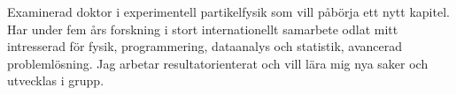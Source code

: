 

\begin{cvparagraph}

Examinerad doktor i experimentell partikelfysik som vill påbörja ett nytt kapitel. %
Har under fem års forskning i stort internationellt samarbete odlat mitt intresserad för fysik, programmering, dataanalys och statistik, avancerad problemlösning. 
Jag arbetar resultatorienterat och vill lära mig nya saker och utvecklas i grupp. %
\end{cvparagraph}